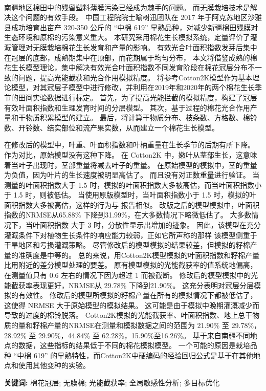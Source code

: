 \begin{doublespace}
    \begin{center}
    \textbf{\songti{\titleCN}}\\
    \end{center}
\end{doublespace}
\begin{spacing}{}
南疆地区棉田中的残留塑料薄膜污染已经成为棘手的问题。%
而无膜栽培技术是解决这个问题的有效手段。%
中国工程院院士喻树迅团队在 2017 年于阿克苏地区沙雅县成功培育出亩产 320{-}350 公斤的 “中棉 619” 早熟品种，对减少新疆棉田残膜对生态环境和原棉的污染意义重大。%
本研究采用棉花生长模拟系统，定量评价了灌溉管理对无膜栽培棉花生长发育和产量的影响。%
有效光合叶面积指数发芽后集中在冠层的底部，成熟期集中在顶部，而花期属于均匀分布，%
本文将借鉴成熟的棉花生长模型理论，集中解决有效光合叶面积指数不同发育阶段在棉花冠层分布不一致的问题，提高光能截获和光合作用模拟精度。
将参考Cotton2K模型作为基本理论模型，对其冠层子模型中进行修改，并利用在2019年和2020年的两个棉花生长季节的田间实验数据进行标定。
首先，为了提高光能拦截的模拟精度，构建了冠层有效叶面积指数和生理发育时间的分层模型。
其次，基于过程的棉花光合作用产量和干物质积累模型的建立。
最后，将计算干物质分布、枝条数、方格数、棉铃数、开铃数、结实部位和流产果实数，从而建立一个棉花生长模型。

在修改后的模型中，叶重、叶面积指数和叶柄重量在生长季节的后期有所下降。
作为对比，原始模型没有这种下降。
在 Cotton2K 中，嫩叶从茎部生长，这意味着当叶子出现时，茎部重量将减去叶子的重量。
在原始模型的模拟中，茎的重量为负值，因为叶片的生长速度被明显高估了。
而且没有对正数重量进行验证。
当测量的叶面积指数大于 1.5 时，模拟的叶面积指数大多被高估，而当叶面积指数小于 1.5 时，则被低估。
当使用原版模型时，当叶面积指数小于 1.5 时，模拟的叶面积指数大多被高估，这样的行为与  报告相似。
改版之后的模型模拟中，叶面积指数的NRMSE从65.88\% 下降到31.99\%，在大多数情况下略微低估了。
大多数情况下，当叶面积指数 大于 3 时，分散性显示出增加的迹象。
因此，该模型在充分灌溉条件下对植物生长条件的响应能力较弱，正如它所声称的那样
该模型侧重于干旱地区和亏损灌溉策略。
尽管修改后的模型模拟的结果较差，但模拟的籽棉产量的准确度是中等的。
总的来说，用Cotton2K模型模拟的叶面积指数和籽棉产量比用附近的差分模型处理的要差。
原有模型模拟的光能截获率的值系统地偏高，在测量值只有 0.6 左右的情况下因为超过 1 而被截断。
修改后的模型模拟中的光能截获率表现更好，NRMSE从 29.78\% 下降到21.90\%。
这充分表明对冠层分层模拟的有效性。
修改后的模型所模拟的籽棉产量在所有的模拟情况下都被低估了，
这使得 NRMSE 大于原始模型的模拟结果。
这可能是由于模拟中晚期灌溉减少而导致的过度的棉铃脱落。
Cotton2K模拟的光能截获率、叶面积指数、地上总干物质的量和籽棉产量的NRMSE在测量和模拟数据之间的范围为
21.90\% 至 29.78\%，28.92\% 至 29.90\%，44.84\% 至 62.28\%，15.90\%至16.26\%。
基于来自南疆不同地点的数据，这些指标的结果低于不同的棉花模拟模型。
一个可能的原因是栽培品种 “中棉 619” 的早熟特性，而Cotton2K中硬编码的经验回归公式是基于在其他地点和使用其他变种的实验。

\textbf{关键词:} 棉花冠层; 无膜棉; 光能截获率; 全局敏感性分析; 多目标优化
\end{spacing}
\newpage

